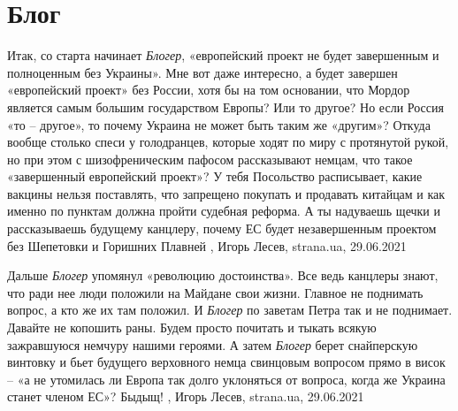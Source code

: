  
 
 
 
 
\chapter{Блог}

Итак, со старта начинает \emph{Блогер}, «европейский проект не будет завершенным и
полноценным без Украины». Мне вот даже интересно, а будет завершен «европейский
проект» без России, хотя бы на том основании, что Мордор является самым большим
государством Европы? Или то другое? Но если Россия «то – другое», то почему
Украина не может быть таким же «другим»? Откуда вообще столько спеси у
голодранцев, которые ходят по миру с протянутой рукой, но при этом с
шизофреническим пафосом рассказывают немцам, что такое «завершенный европейский
проект»? У тебя Посольство расписывает, какие вакцины нельзя поставлять, что
запрещено покупать и продавать китайцам и как именно по пунктам должна пройти
судебная реформа. А ты надуваешь щечки и рассказываешь будущему канцлеру,
почему ЕС будет незавершенным проектом без Шепетовки и Горишних Плавней
, 
Игорь Лесев, strana.ua, 29.06.2021

Дальше \emph{Блогер} упомянул «революцию достоинства». Все ведь канцлеры знают, что
ради нее люди положили на Майдане свои жизни. Главное не поднимать вопрос, а
кто же их там положил. И \emph{Блогер} по заветам Петра так и не поднимает. Давайте не
копошить раны. Будем просто почитать и тыкать всякую зажравшуюся немчуру нашими
героями.  А затем \emph{Блогер} берет снайперскую винтовку и бьет будущего верховного
немца свинцовым вопросом прямо в висок – «а не утомилась ли Европа так долго
уклоняться от вопроса, когда же Украина станет членом ЕС»? Быдыщ! 
, 
Игорь Лесев, strana.ua, 29.06.2021
